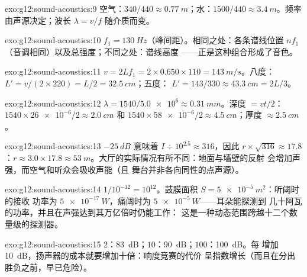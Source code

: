 \begin{solution}{exo:g12:sound-acoustics:9}
空气：$340/440 \approx \qty{0.77}{m}$；水：$1500/440 \approx
\qty{3.4}{m}$。频率由声源决定；波长
$\lambda = v/f$ 随介质而变。
\end{solution}

\begin{solution}{exo:g12:sound-acoustics:10}
$f_1 = \qty{130}{Hz}$（峰间距）。相同之处：各条谱线位置
$nf_1$（音调相同）以及总强度；不同之处：谱线高度
——正是这种组合形成了音色。
\end{solution}

\begin{solution}{exo:g12:sound-acoustics:11}
$v = 2Lf_1 = 2 \times 0.650 \times 110 = \qty{143}{m/s}$。八度：
$L' = v/(2 \times 220) = L/2 = \qty{32.5}{cm}$；五度：
$L' = 143/330 \approx \qty{43.3}{cm} = 2L/3$。
\end{solution}

\begin{solution}{exo:g12:sound-acoustics:12}
$\lambda = 1540/\num{5.0e6} \approx \qty{0.31}{mm}$。深度 $= vt/2$：
$1540 \times \num{26e-6}/2 \approx \qty{2.0}{cm}$ 和
$1540 \times \num{58e-6}/2 \approx \qty{4.5}{cm}$；厚度
$\approx \qty{2.5}{cm}$。
\end{solution}

\begin{solution}{exo:g12:sound-acoustics:13}
$-\qty{25}{dB}$ 意味着 $I \div 10^{2.5} \approx 316$，因此
$r \times \sqrt{316} \approx 17.8$：$r \approx 3.0 \times 17.8
\approx \qty{53}{m}$。大厅的实际情况有所不同：地面与墙壁的反射
会增加声强，而空气和听众会吸收声能（且
舞台并非各向同性的点声源）。
\end{solution}

\begin{solution}{exo:g12:sound-acoustics:14}
$1/10^{-12} = 10^{12}$。鼓膜面积 $S = \qty{5e-5}{m^2}$：听阈时的接收
功率为 $\qty{5e-17}{W}$，痛阈时为 $\qty{5e-5}{W}$——耳朵能探测到
几十阿瓦的功率，并且在声强达到其万亿倍时仍能工作：
这是一种动态范围跨越十二个数量级的探测器。
\end{solution}

\begin{solution}{exo:g12:sound-acoustics:15}
$2$：\qty{83}{dB}；$10$：\qty{90}{dB}；$100$：\qty{100}{dB}。每
增加 \qty{+10}{dB}，扬声器的成本就要增加十倍：响度竞赛的代价
呈指数增长（而且在分出胜负之前，早已危险）。
\end{solution}

